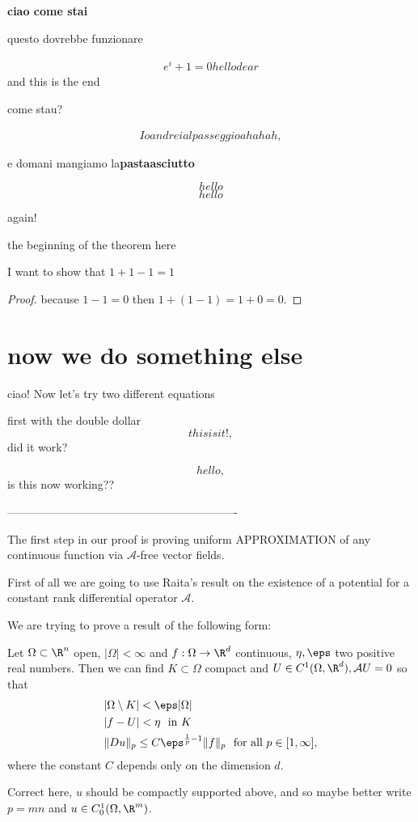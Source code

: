 \textbf{ciao come stai}

questo dovrebbe funzionare

\begin{align*}
e^i+1=0 hello dear
\end{align*}
and this is the end

come stau?

\begin{align}
Io andrei al passeggio ahahah,
\end{align}

e domani mangiamo la\textbf{pastaasciutto}

\begin{equation} hello \end{equation}
\begin{equation*} hello \end{equation*}

again! \centering

the beginning of the theorem {\Large here}
\begin{theorem}
I want to show that $1+1-1 = 1$
\end{theorem}
\begin{proof}
because $1-1=0$ then $1+(1-1)=1+0=0.$
\end{proof}

\section*{now we do something else}

ciao! Now let's try {\small two different equations}

first with the double dollar
$$
this is it!,
$$
did it work?

\[ hello, \] is this now working??

-------------------------------------------------------------


The first step in our proof is proving uniform APPROXIMATION of any continuous function via $\mathcal{A}$-free vector fields.

First of all we are going to use Raita's result on the existence of a potential for a constant rank differential operator $\mathcal{A}$.

We are trying to prove a result of the following form:
\begin{lemma} \label{eps-approximation}
Let $\Omega\subset \R^n$ open, $|\Omega|<\infty$ and $f:\Omega\to \R^d$ continuous, $\eta,\eps$ two positive real numbers. Then we can find $K\subset\Omega$ compact and $U\in C^1(\Omega,\R^d),\mathcal{A}U=0$ so that
\begin{align}
& |\Omega\setminus K|<\eps |\Omega| \\
& |f-U|<\eta \ \text{ in } K \\
& \|Du\|_p \leq C \eps^{\frac{1}{p}-1} \|f\|_p \ \text{ for all }p\in [1,\infty],
\end{align}
where the constant $C$ depends only on the dimension $d$.

{\color{red} Correct here, $u$ should be compactly supported above, and so maybe better write $p=mn$ and $u\in C_0^1(\Omega,\R^m)$.}

\end{lemma}

